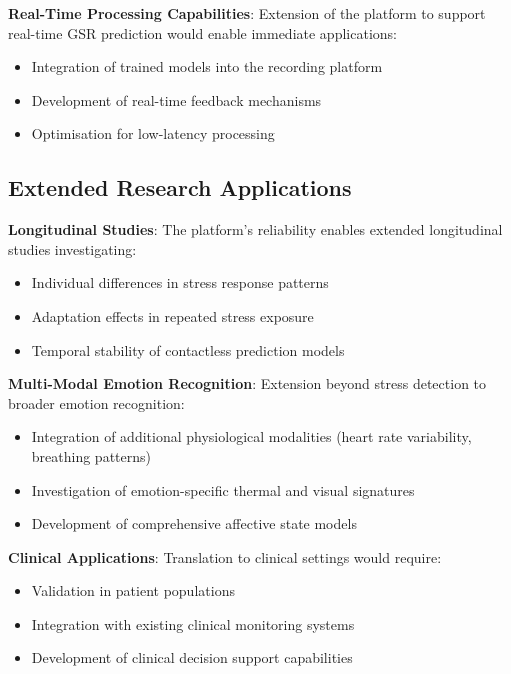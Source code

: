 \textbf{Real-Time Processing Capabilities}: Extension of the platform to support real-time GSR prediction would enable immediate applications:

\begin{itemize}
\item Integration of trained models into the recording platform
\item Development of real-time feedback mechanisms
\item Optimisation for low-latency processing
\end{itemize}

\subsection{Extended Research Applications}

\textbf{Longitudinal Studies}: The platform's reliability enables extended longitudinal studies investigating:

\begin{itemize}
\item Individual differences in stress response patterns
\item Adaptation effects in repeated stress exposure
\item Temporal stability of contactless prediction models
\end{itemize}

\textbf{Multi-Modal Emotion Recognition}: Extension beyond stress detection to broader emotion recognition:

\begin{itemize}
\item Integration of additional physiological modalities (heart rate variability, breathing patterns)
\item Investigation of emotion-specific thermal and visual signatures
\item Development of comprehensive affective state models
\end{itemize}

\textbf{Clinical Applications}: Translation to clinical settings would require:

\begin{itemize}
\item Validation in patient populations
\item Integration with existing clinical monitoring systems
\item Development of clinical decision support capabilities
\end{itemize}

